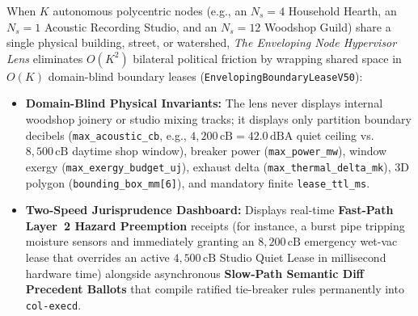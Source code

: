 When $K$ autonomous polycentric nodes (e.g., an $N_s=4$ Household Hearth, an $N_s=1$ Acoustic Recording Studio, and an $N_s=12$ Woodshop Guild) share a single physical building, street, or watershed, \textit{The Enveloping Node Hypervisor Lens} eliminates $O(K^2)$ bilateral political friction by wrapping shared space in $O(K)$ domain-blind boundary leases (\texttt{EnvelopingBoundaryLeaseV50}):
\begin{itemize}
    \item \textbf{Domain-Blind Physical Invariants:} The lens never displays internal woodshop joinery or studio mixing tracks; it displays only partition boundary decibels (\texttt{max\_acoustic\_cb}, e.g., $4{,}200\,\mathrm{cB} = 42.0\,\mathrm{dBA}$ quiet ceiling vs.\ $8{,}500\,\mathrm{cB}$ daytime shop window), breaker power (\texttt{max\_power\_mw}), window exergy (\texttt{max\_exergy\_budget\_uj}), exhaust delta (\texttt{max\_thermal\_delta\_mk}), 3D polygon (\texttt{bounding\_box\_mm[6]}), and mandatory finite \texttt{lease\_ttl\_ms}.
    \item \textbf{Two-Speed Jurisprudence Dashboard:} Displays real-time \textbf{Fast-Path Layer~2 Hazard Preemption} receipts (for instance, a burst pipe tripping moisture sensors and immediately granting an $8{,}200\,\mathrm{cB}$ emergency wet-vac lease that overrides an active $4{,}500\,\mathrm{cB}$ Studio Quiet Lease in millisecond hardware time) alongside asynchronous \textbf{Slow-Path Semantic Diff Precedent Ballots} that compile ratified tie-breaker rules permanently into \texttt{col-execd}.
\end{itemize}

